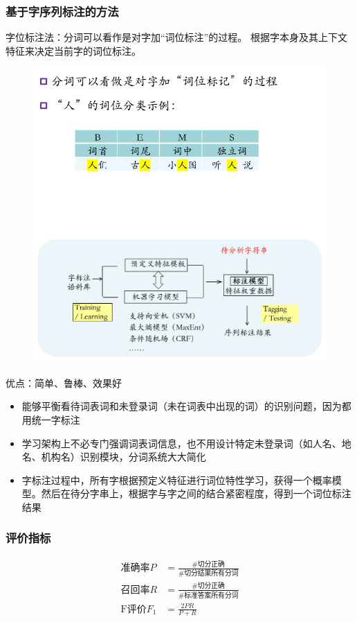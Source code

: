 \subsubsection{基于字序列标注的方法}
字位标注法：分词可以看作是对字加``词位标注''的过程。
根据字本身及其上下文特征来决定当前字的词位标注。
\begin{figure}[H]
\centering
\includegraphics[width=0.6\linewidth]{fig/word_pos_labeling.png}
\includegraphics[width=0.6\linewidth]{fig/word_seq_labeling.png}
\end{figure}

优点：简单、鲁棒、效果好
\begin{itemize}
	\item 能够平衡看待词表词和未登录词（未在词表中出现的词）的识别问题，因为都用统一字标注
	\item 学习架构上不必专门强调词表词信息，也不用设计特定未登录词（如人名、地名、机构名）识别模块，分词系统大大简化
	\item 字标注过程中，所有字根据预定义特征进行词位特性学习，获得一个概率模型。然后在待分字串上，根据字与字之间的结合紧密程度，得到一个词位标注结果
\end{itemize}

\subsubsection{评价指标}
\[\begin{aligned}
\text{准确率}P&=\frac{\#\text{切分正确}}{\#\text{切分结果所有分词}}\\
\text{召回率}R&=\frac{\#\text{切分正确}}{\#\text{标准答案所有分词}}\\
\text{F评价}F_1&=\frac{2PR}{P+R}
\end{aligned}\]